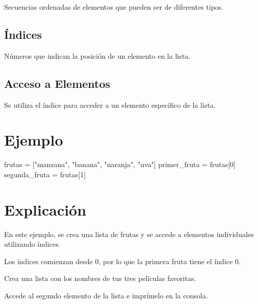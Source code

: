 \documentclass[
  a4paper,
  onepage,
  openany]{scrreprt}
\newenvironment{Shaded}{\begin{snugshade}}{\end{snugshade}}
\newcommand{\DecValTok}[1]{\textcolor[rgb]{0.68,0.00,0.00}{#1}}
\newcommand{\NormalTok}[1]{\textcolor[rgb]{0.00,0.23,0.31}{#1}}
\newcommand{\OperatorTok}[1]{\textcolor[rgb]{0.37,0.37,0.37}{#1}}
\newcommand{\StringTok}[1]{\textcolor[rgb]{0.13,0.47,0.30}{#1}}
\begin{document}
Secuencias ordenadas de elementos que pueden ser de diferentes tipos.

\hypertarget{uxedndices-1}{%
\subsection{Índices}\label{uxedndices-1}}

Números que indican la posición de un elemento en la lista.

\hypertarget{acceso-a-elementos-1}{%
\subsection{Acceso a Elementos}\label{acceso-a-elementos-1}}

Se utiliza el índice para acceder a un elemento específico de la lista.

\hypertarget{ejemplo-19}{%
\section{Ejemplo}\label{ejemplo-19}}

\begin{Shaded}
\begin{Highlighting}[]
\NormalTok{frutas }\OperatorTok{=}\NormalTok{ [}\StringTok{"manzana"}\NormalTok{, }\StringTok{"banana"}\NormalTok{, }\StringTok{"naranja"}\NormalTok{, }\StringTok{"uva"}\NormalTok{]}
\NormalTok{primer\_fruta }\OperatorTok{=}\NormalTok{ frutas[}\DecValTok{0}\NormalTok{]}
\NormalTok{segunda\_fruta }\OperatorTok{=}\NormalTok{ frutas[}\DecValTok{1}\NormalTok{]}
\end{Highlighting}
\end{Shaded}

\hypertarget{explicaciuxf3n-19}{%
\section{Explicación}\label{explicaciuxf3n-19}}

En este ejemplo, se crea una lista de frutas y se accede a elementos
individuales utilizando índices.

Los índices comienzan desde 0, por lo que la primera fruta tiene el
índice 0.

\begin{tcolorbox}[enhanced jigsaw, breakable, opacityback=0, toptitle=1mm, coltitle=black, toprule=.15mm, rightrule=.15mm, colframe=quarto-callout-important-color-frame, opacitybacktitle=0.6, arc=.35mm, title=\textcolor{quarto-callout-important-color}{\faExclamation}\hspace{0.5em}{Actividad Práctica:}, titlerule=0mm, colbacktitle=quarto-callout-important-color!10!white, bottomtitle=1mm, bottomrule=.15mm, colback=white, left=2mm, leftrule=.75mm]

Crea una lista con los nombres de tus tres películas favoritas.

Accede al segundo elemento de la lista e imprímelo en la consola.

\end{tcolorbox}
\end{document}
